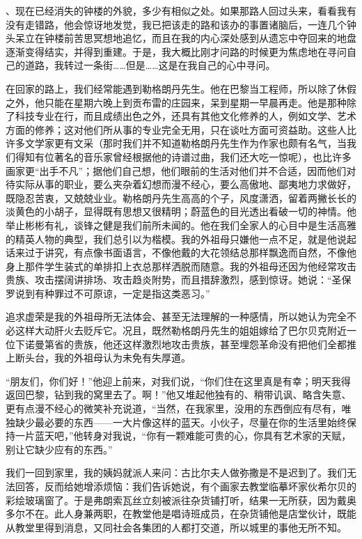 、现在已经消失的钟楼的外貌，多少有相似之处。如果那路人回过头来，看看我有没有走错路，他会惊讶地发觉，我已把该走的路和该办的事置诸脑后，一连几个钟头呆立在钟楼前苦思冥想地追忆，而且在我的内心深处感到从遗忘中夺回来的地盘逐渐变得结实，并得到重建。于是，我大概比刚才问路的时候更为焦虑地在寻问自己的道路，我转过一条街……但是……这是在我自己的心中寻问。
\par 在回家的路上，我们经常能遇到勒格朗丹先生。他在巴黎当工程师，所以除了休假之外，他只能在星期六晚上到贡布雷的庄园来，呆到星期一早晨再走。他是那种除了科技专业在行，而且成绩出色之外，还具有其他文化修养的人，例如文学、艺术方面的修养；这对他们所从事的专业完全无用，只在谈吐方面可资益助。这些人比许多文学家更有文采（那时我们并不知道勒格朗丹先生作为作家也颇有名气，当我们得知有位著名的音乐家曾经根据他的诗谱过曲，我们还大吃一惊呢），也比许多画家更“出手不凡”；据他们自己想，他们眼前的生活对他们并不合适，因而他们对待实际从事的职业，要么夹杂着幻想而漫不经心，要么高傲地、鄙夷地力求做好，既隐忍苦衷，又兢兢业业。勒格朗丹先生高高的个子，风度潇洒，留着两撇长长的淡黄色的小胡子，显得既有思想又很精明；蔚蓝色的目光透出看破一切的神情。他举止彬彬有礼，谈锋之健是我们前所未闻的。他在我们全家人的心目中是生活高雅的精英人物的典型，我们总引以为楷模。我的外祖母只嫌他一点不足，就是他说起话来过于讲究，有点像书面语言，不像他戴的大花领结总那样飘逸而自然，不像他身上那件学生装式的单排扣上衣总那样洒脱而随意。我的外祖母还因为他经常攻击贵族、攻击摆阔讲排场、攻击趋炎附势，而且措辞激烈，感到惊讶。她说：“圣保罗说到有种罪过不可原谅，一定是指这类恶习。”
\par 追求虚荣是我的外祖母所无法体会、甚至无法理解的一种感情，所以她认为完全不必这样大动肝火去贬斥它。况且，既然勒格朗丹先生的姐姐嫁给了巴尔贝克附近一位下诺曼第省的贵族，他还这样激烈地攻击贵族，甚至埋怨革命没有把他们全都推上断头台，我的外祖母认为未免有失厚道。
\par “朋友们，你们好！”他迎上前来，对我们说，“你们住在这里真是有幸；明天我得返回巴黎，钻到我的窝里去了。啊！”他又堆起他独有的、稍带讥讽、略含失意、更有点漫不经心的微笑补充说道，“当然，在我家里，没用的东西倒应有尽有，唯独缺少最必要的东西——一大片像这样的蓝天。小伙子，尽量在你的生活里始终保持一片蓝天吧，”他转身对我说，“你有一颗难能可贵的心，你具有艺术家的天赋，别让它缺少应有的东西。”
\par 我们一回到家里，我的姨妈就派人来问：古比尔夫人做弥撒是不是迟到了。我们无法回答，反而给她增添烦恼：我们告诉她说，有个画家去教堂临摹坏家伙希尔贝的彩绘玻璃窗了。于是弗朗索瓦丝立刻被派往杂货铺打听，结果一无所获，因为戴奥多尔不在。此人身兼两职，在教堂他是唱诗班成员，在杂货铺他是店堂伙计，既能从教堂里得到消息，又同社会各集团的人都打交道，所以城里的事他无所不知。

